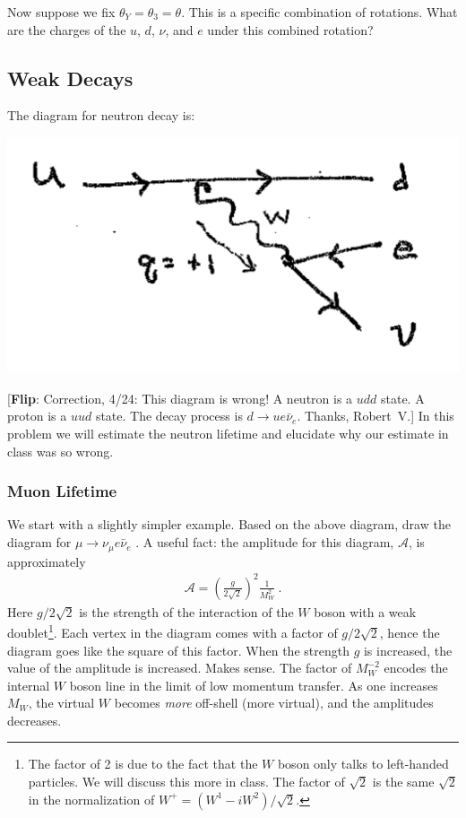 \documentclass[12pt]{article}
\newcommand{\flip}[1]{{\color{red} [\textbf{Flip}: {#1}]}}
\begin{document}
Now suppose we fix $\theta_Y = \theta_3 =\theta$. This is a specific combination of rotations. What are the charges of the $u$, $d$, $\nu$, and $e$ under this combined rotation? 

 
\subsection{Weak Decays}

The diagram for neutron decay is:
\begin{center}
	\includegraphics[width=.4\textwidth]{HW2b.png}
\end{center}
\flip{Correction, 4/24: This diagram is wrong! A neutron is a $udd$ state. A proton is a $uud$ state. The decay process is $d\to ue\bar\nu_e$. Thanks, Robert~V.}
In this problem we will estimate the neutron lifetime and elucidate why our estimate in class was so wrong.

\subsubsection{Muon Lifetime}

We start with a slightly simpler example. Based on the above diagram, draw the diagram for $\mu \to \nu_\mu e \bar\nu_e$ . A useful fact: the amplitude for this diagram, $\mathcal A$, is approximately
\begin{align}
	\mathcal A = \left(\frac{g}{2\sqrt{2}}\right)^2 \frac{1}{M_W^2} \ .
\end{align}
Here $g/2\sqrt{2}$ is the strength of the interaction of the $W$ boson with a weak doublet\footnote{The factor of 2 is due to the fact that the $W$ boson only talks to left-handed particles. We will discuss this more in class. The factor of $\sqrt{2}$ is the same $\sqrt{2}$ in the normalization of $W^+ = (W^1 - iW^2)/\sqrt{2}$.}. Each vertex in the diagram comes with a factor of $g/2\sqrt{2}$, hence the diagram goes like the square of this factor. When the strength $g$ is increased, the value of the amplitude is increased. Makes sense. The factor of $M_W^{-2}$ encodes the internal $W$ boson line in the limit of low momentum transfer. As one increases $M_W$, the virtual $W$ becomes \emph{more} off-shell (more virtual), and the amplitudes decreases. 
\end{document}
